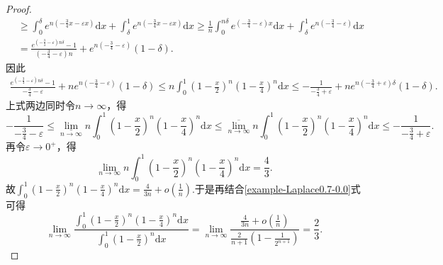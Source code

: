 \documentclass[../../main.tex]{subfiles}%
\begin{document}
\begin{proof}
\begin{align*}
&\geqslant \int_0^{\delta}{e^{n\left( -\frac{3}{4}x-\varepsilon x \right)}\mathrm{d}x}+\int_{\delta}^1{e^{n\left( -\frac{3}{4}x-\varepsilon x \right)}\mathrm{d}x}\geqslant \frac{1}{n}\int_0^{n\delta}{e^{\left( -\frac{3}{4}-\varepsilon \right) x}\mathrm{d}x}+\int_{\delta}^1{e^{n\left( -\frac{3}{4}-\varepsilon \right)}\mathrm{d}x}\\
&=\frac{e^{\left( -\frac{3}{4}-\varepsilon \right) n\delta}-1}{\left( -\frac{3}{4}-\varepsilon \right) n}+e^{n\left( -\frac{3}{4}-\varepsilon \right)}\left( 1-\delta \right) .
\end{align*}
因此
\begin{align*}
\frac{e^{\left( -\frac{3}{4}-\varepsilon \right) n\delta}-1}{-\frac{3}{4}-\varepsilon}+ne^{n\left( -\frac{3}{4}-\varepsilon \right)}\left( 1-\delta \right) \leqslant n\int_0^1{\left( 1-\frac{x}{2} \right) ^n\left( 1-\frac{x}{4} \right) ^n\mathrm{d}x}\leqslant -\frac{1}{-\frac{3}{4}+\varepsilon}+ne^{n\left( -\frac{3}{4}+\varepsilon \right) \delta}\left( 1-\delta \right) .
\end{align*}
上式两边同时令$n\rightarrow \infty$，得
\[
-\frac{1}{-\frac{3}{4}-\varepsilon}\leqslant \underset{n\rightarrow \infty}{\underline{\lim }}n\int_0^1{\left( 1-\frac{x}{2} \right) ^n\left( 1-\frac{x}{4} \right) ^n\mathrm{d}x}\leqslant \underset{n\rightarrow \infty}{\overline{\lim }}n\int_0^1{\left( 1-\frac{x}{2} \right) ^n\left( 1-\frac{x}{4} \right) ^n\mathrm{d}x}\leqslant -\frac{1}{-\frac{3}{4}+\varepsilon}.
\]
再令$\varepsilon \rightarrow 0^+$，得
\[
\lim\limits_{n\rightarrow \infty}n\int_0^1{\left( 1-\frac{x}{2} \right) ^n\left( 1-\frac{x}{4} \right) ^n\mathrm{d}x}=\frac{4}{3}.
\]
故$\int_0^1{\left( 1-\frac{x}{2} \right) ^n\left( 1-\frac{x}{4} \right) ^n\mathrm{d}x}=\frac{4}{3n}+o\left( \frac{1}{n} \right) .$于是再结合\eqref{example-Laplace0.7-0.0}式可得
\[
\lim_{n\rightarrow \infty} \frac{\int_0^1{\left( 1-\frac{x}{2} \right) ^n\left( 1-\frac{x}{4} \right) ^n\mathrm{d}x}}{\int_0^1{\left( 1-\frac{x}{2} \right) ^n\mathrm{d}x}}=\lim_{n\rightarrow \infty} \frac{\frac{4}{3n}+o\left( \frac{1}{n} \right)}{\frac{2}{n+1}\left( 1-\frac{1}{2^{n+1}} \right)}=\frac{2}{3}.
\]

\end{proof}
\end{document}
